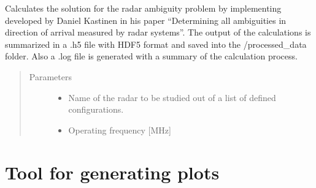 \documentclass[letterpaper,12pt,english]{sphinxmanual}
\begin{document}
\begin{fulllineitems}
\label{\detokenize{radar:ambiguity_calculator.ambiguities_calculate}}
Calculates the solution for the radar ambiguity problem by implementing developed by Daniel Kastinen in his paper
“Determining all ambiguities in direction of arrival measured by radar systems”. The output of the calculations is
summarized in a .h5 file with HDF5 format and saved into the /processed\_data folder. Also a .log file is generated
with a summary of the calculation process.
\begin{quote}\begin{description}
\item[{Parameters}] \leavevmode\begin{itemize}
\item {} 
 \textendash{} Name of the radar to be studied out of a list of defined configurations.

\item {} 
 \textendash{} Operating frequency {[}MHz{]}

\end{itemize}

\end{description}\end{quote}

\end{fulllineitems}



\chapter{Tool for generating plots}
\label{\detokenize{plots_generator:module-plots_generator}}\label{\detokenize{plots_generator:tool-for-generating-plots}}\label{\detokenize{plots_generator::doc}}
\end{document}
